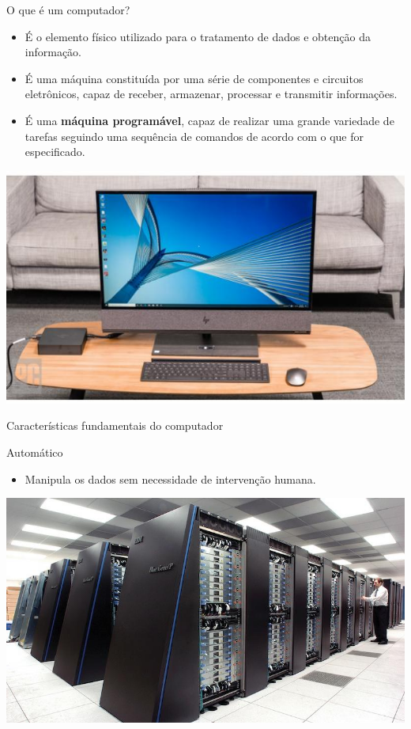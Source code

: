 \begin{frame}{O que é um computador?}
	\begin{block}{}
		\begin{itemize}
			\item É o elemento físico utilizado para o tratamento de dados e obtenção da informação.
			\item É uma máquina constituída por uma série de componentes e circuitos eletrônicos, capaz de receber, armazenar, processar e transmitir informações.
			\item É uma \textbf{máquina programável}, capaz de realizar uma
			      grande variedade de tarefas seguindo uma sequência de
			      comandos de acordo com o que for especificado.
		\end{itemize}
	\end{block}

	\centering
	\includegraphics[width=0.45\linewidth]{Figuras/Ch01/fig2}
\end{frame}


\begin{frame}{Características fundamentais do computador}
	\begin{block}{Automático}
		\begin{itemize}
			\item Manipula os dados sem necessidade de intervenção humana.
		\end{itemize}
	\end{block}

	\medskip

	\centering
	\includegraphics[width=0.8\linewidth]{Figuras/Ch01/fig3}
\end{frame}


